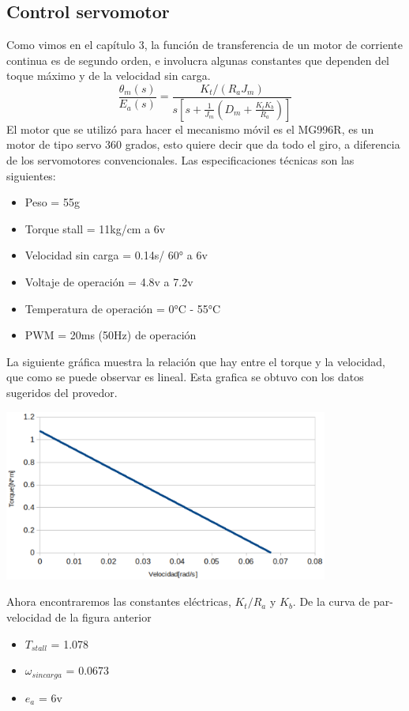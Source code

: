 \subsection{Control servomotor}
Como vimos en el capítulo 3, la función de transferencia de un motor de corriente continua es de segundo orden, e involucra algunas constantes que dependen del toque máximo y
de la velocidad sin carga.
\begin{equation}
	\frac{\theta_m (s)}{E_a(s)} = \frac{K_t / (R_aJ_m)}{s \left[ s + \frac{1}{J_m} \left( D_m + \frac{K_tK_b}{R_a} \right) \right]}
\end{equation}
El motor que se utilizó para hacer el mecanismo móvil es el MG996R, es un motor de tipo servo 360 grados, esto quiere decir que da todo el giro, a diferencia de los servomotores
convencionales. Las especificaciones técnicas son las siguientes:
\begin{itemize}
	\item Peso = 55g
	\item Torque stall = 11kg/cm a 6v
	\item Velocidad sin carga = 0.14s/ 60° a 6v
	\item Voltaje de operación = 4.8v a 7.2v
	\item Temperatura de operación = 0°C - 55°C
	\item PWM = 20ms (50Hz) de operación
\end{itemize}
La siguiente gráfica muestra la relación que hay entre el torque y la velocidad, que como se puede observar es lineal. Esta grafica se obtuvo con los datos sugeridos del
provedor.
\begin{center}
	\includegraphics[width=0.8\textwidth]{Contenido/Cuerpo/Capitulo5/Fig19.eps}
	\label{Fig4}
\end{center}
Ahora encontraremos las constantes eléctricas, $K_t / R_a$ y $K_b$. De la curva de par-velocidad de la figura anterior
\begin{itemize}
	\item $T_{stall}$ = 1.078
	\item $\omega_{sincarga}$ = 0.0673
	\item $e_a$ = 6v
\end{itemize}
